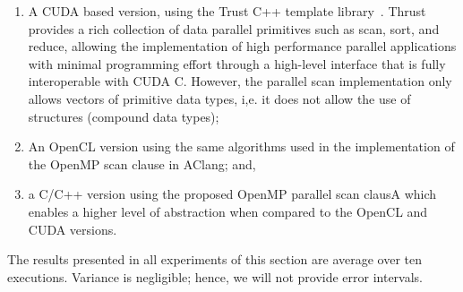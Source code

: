 \documentclass[Ingles]{ic-tese-v1}
\begin{document}
\begin{enumerate}
	\item A CUDA based version, using the Trust C++ template library~\cite{trust}.
	Thrust provides a  rich collection of data  parallel primitives such
	as scan,  sort, and reduce,  allowing the implementation of  high performance
	parallel  applications with  minimal  programming  effort through  a
	high-level  interface   that  is   fully  interoperable   with  CUDA
	C. However, the parallel scan  implementation only allows vectors of
	primitive  data  types, i,e.   it  does  not  allow the  use  of
	structures (compound data types);
	\item An  OpenCL version using the same algorithms used in the
	implementation of the OpenMP scan clause in AClang; and,
	\item a C/C++ version using the proposed OpenMP parallel scan clausA
	which enables a  higher level of abstraction when compared to the OpenCL and
	CUDA versions.
\end{enumerate}

The results presented  in all experiments of this  section are average
over  ten  executions. Variance  is  negligible;  hence, we  will  not
provide error intervals.

\end{document}
